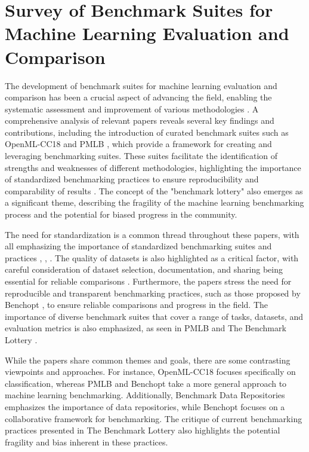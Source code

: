 \documentclass[conference]{IEEEtran}
\begin{document}
\section{Survey of Benchmark Suites for Machine Learning Evaluation and Comparison}
The development of benchmark suites for machine learning evaluation and comparison has been a crucial aspect of advancing the field, enabling the systematic assessment and improvement of various methodologies \cite{b1}. A comprehensive analysis of relevant papers reveals several key findings and contributions, including the introduction of curated benchmark suites such as OpenML-CC18 \cite{b2} and PMLB \cite{b3}, which provide a framework for creating and leveraging benchmarking suites. These suites facilitate the identification of strengths and weaknesses of different methodologies, highlighting the importance of standardized benchmarking practices to ensure reproducibility and comparability of results \cite{b4}. The concept of the "benchmark lottery" \cite{b5} also emerges as a significant theme, describing the fragility of the machine learning benchmarking process and the potential for biased progress in the community.

The need for standardization is a common thread throughout these papers, with all emphasizing the importance of standardized benchmarking suites and practices \cite{b2}, \cite{b3}, \cite{b6}. The quality of datasets is also highlighted as a critical factor, with careful consideration of dataset selection, documentation, and sharing being essential for reliable comparisons \cite{b7}. Furthermore, the papers stress the need for reproducible and transparent benchmarking practices, such as those proposed by Benchopt \cite{b8}, to ensure reliable comparisons and progress in the field. The importance of diverse benchmark suites that cover a range of tasks, datasets, and evaluation metrics is also emphasized, as seen in PMLB \cite{b3} and The Benchmark Lottery \cite{b5}.

While the papers share common themes and goals, there are some contrasting viewpoints and approaches. For instance, OpenML-CC18 \cite{b2} focuses specifically on classification, whereas PMLB \cite{b3} and Benchopt \cite{b8} take a more general approach to machine learning benchmarking. Additionally, Benchmark Data Repositories \cite{b9} emphasizes the importance of data repositories, while Benchopt \cite{b8} focuses on a collaborative framework for benchmarking. The critique of current benchmarking practices presented in The Benchmark Lottery \cite{b5} also highlights the potential fragility and bias inherent in these practices.
\end{document}
